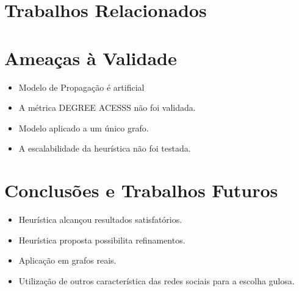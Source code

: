 \documentclass[12pt]{article}
\begin{document}
\section{Trabalhos Relacionados}
\label{sec:trab_relacionados}


\section{Ameaças à Validade}
\label{sec:ameacas}
\begin{itemize}
		
		\item Modelo de Propagação é artificial
		\item A métrica \textsc{DEGREE ACESSS}{} não foi validada.
		\item Modelo aplicado a um único grafo.
		\item A escalabilidade da heurística não foi testada.		
	\end{itemize}

\section{Conclusões e Trabalhos Futuros}

\begin{itemize}
		
		\item Heurística alcançou resultados satisfatórios.
		\item Heurística proposta possibilita refinamentos.
		\item Aplicação em grafos reais.
		\item Utilização de outros característica das redes sociais para a escolha gulosa.			
		
	\end{itemize}	



\end{document}
